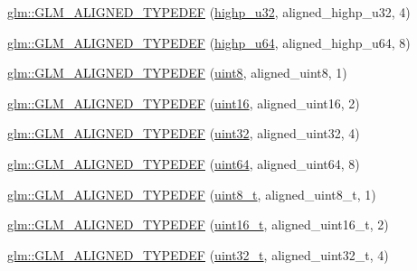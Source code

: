\begin{DoxyCompactItemize}
\hyperlink{group__gtx__type__aligned_gaaadbb34952eca8e3d7fe122c3e167742}{glm\+::\+G\+L\+M\+\_\+\+A\+L\+I\+G\+N\+E\+D\+\_\+\+T\+Y\+P\+E\+D\+EF} (\hyperlink{group__gtc__type__precision_gae8e8a2c712653891a03c171795286ac5}{highp\+\_\+u32}, aligned\+\_\+highp\+\_\+u32, 4)
\item 
\hyperlink{group__gtx__type__aligned_ga92024d27c74a3650afb55ec8e024ed25}{glm\+::\+G\+L\+M\+\_\+\+A\+L\+I\+G\+N\+E\+D\+\_\+\+T\+Y\+P\+E\+D\+EF} (\hyperlink{group__gtc__type__precision_ga6006ea883d3c0491791650b2fb84de39}{highp\+\_\+u64}, aligned\+\_\+highp\+\_\+u64, 8)
\item 
\hyperlink{group__gtx__type__aligned_gabde1d0b4072df35453db76075ab896a6}{glm\+::\+G\+L\+M\+\_\+\+A\+L\+I\+G\+N\+E\+D\+\_\+\+T\+Y\+P\+E\+D\+EF} (\hyperlink{group__gtc__type__precision_ga1a7dcd8aac97cc8020817c94049deff2}{uint8}, aligned\+\_\+uint8, 1)
\item 
\hyperlink{group__gtx__type__aligned_ga06c296c9e398b294c8c9dd2a7693dcbb}{glm\+::\+G\+L\+M\+\_\+\+A\+L\+I\+G\+N\+E\+D\+\_\+\+T\+Y\+P\+E\+D\+EF} (\hyperlink{group__gtc__type__precision_gad8c2939e1fdd8e5828b31d95c52255d5}{uint16}, aligned\+\_\+uint16, 2)
\item 
\hyperlink{group__gtx__type__aligned_gacf1744488c96ebd33c9f36ad33b2010a}{glm\+::\+G\+L\+M\+\_\+\+A\+L\+I\+G\+N\+E\+D\+\_\+\+T\+Y\+P\+E\+D\+EF} (\hyperlink{group__gtc__type__precision_ga202b6a53c105fcb7e531f9b443518451}{uint32}, aligned\+\_\+uint32, 4)
\item 
\hyperlink{group__gtx__type__aligned_ga3328061a64c20ba59d5f9da24c2cd059}{glm\+::\+G\+L\+M\+\_\+\+A\+L\+I\+G\+N\+E\+D\+\_\+\+T\+Y\+P\+E\+D\+EF} (\hyperlink{group__gtc__type__precision_gae3632bf9b37da66233d78930dd06378a}{uint64}, aligned\+\_\+uint64, 8)
\item 
\hyperlink{group__gtx__type__aligned_gaf6ced36f13bae57f377bafa6f5fcc299}{glm\+::\+G\+L\+M\+\_\+\+A\+L\+I\+G\+N\+E\+D\+\_\+\+T\+Y\+P\+E\+D\+EF} (\hyperlink{group__gtc__type__precision_ga93adf6dd9803408f3e3aaf9dedda352b}{uint8\+\_\+t}, aligned\+\_\+uint8\+\_\+t, 1)
\item 
\hyperlink{group__gtx__type__aligned_gafbc7fb7847bfc78a339d1d371c915c73}{glm\+::\+G\+L\+M\+\_\+\+A\+L\+I\+G\+N\+E\+D\+\_\+\+T\+Y\+P\+E\+D\+EF} (\hyperlink{group__gtc__type__precision_gac4eb4f43cae8129b00086dc234d3b8fc}{uint16\+\_\+t}, aligned\+\_\+uint16\+\_\+t, 2)
\item 
\hyperlink{group__gtx__type__aligned_gaa86bc56a73fd8120b1121b5f5e6245ae}{glm\+::\+G\+L\+M\+\_\+\+A\+L\+I\+G\+N\+E\+D\+\_\+\+T\+Y\+P\+E\+D\+EF} (\hyperlink{group__gtc__type__precision_ga822ca53a9ad412504532838906276a99}{uint32\+\_\+t}, aligned\+\_\+uint32\+\_\+t, 4)

\end{DoxyCompactItemize}
